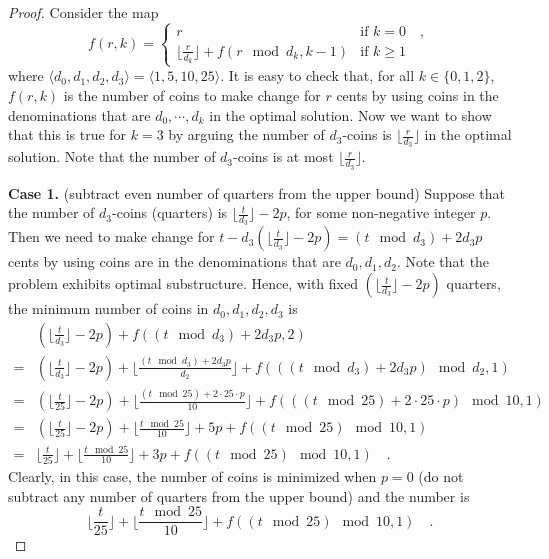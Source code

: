 \begin{proof}
    Consider the map 
    \begin{equation*}
        f(r, k) = 
    \begin{cases}
        r & \text{if } k = 0 \quad , \\
        \lfloor \frac{r}{d_k} \rfloor + f(r \mod d_k, k - 1)
            & \text{if } k \geq 1 
    \end{cases}
    \end{equation*}
    where $\langle d_0, d_1, d_2, d_3 \rangle = \langle 1, 5, 10, 25 \rangle$.
    It is easy to check that, for all $k \in \{ 0, 1, 2 \}$, 
    $f(r, k)$ is the number of coins to make change for $r$ cents 
    by using coins in the denominations that are $d_0, \cdots, d_k$
    in the optimal solution.
    Now we want to show that this is true for $k = 3$ 
    by arguing the number of $d_3$-coins is $\lfloor \frac{r}{d_3} \rfloor$ in the optimal solution.
    Note that the number of $d_3$-coins is 
    at most $\lfloor \frac{r}{d_3} \rfloor$.

    \textbf{Case 1. } (subtract even number of quarters from the upper bound) 
    Suppose that the number of $d_3$-coins (quarters) is 
    $\lfloor \frac{t}{d_3} \rfloor - 2p$, for some non-negative integer $p$.
    Then we need to make change for 
    $t - d_3 (\lfloor \frac{t}{d_3} \rfloor - 2p) = (t \mod d_3) + 2 d_3 p$ cents
    by using coins are in the denominations that are $d_0, d_1, d_2$.
    Note that the problem exhibits optimal substructure.
    Hence, with fixed $(\lfloor \frac{t}{d_3} \rfloor - 2p)$ quarters, 
    the minimum number of coins in $d_0, d_1, d_2, d_3$ is 
    \begin{equation*}
    \begin{split}
        & (\lfloor \frac{t}{d_3} \rfloor - 2p) + f((t \mod d_3) + 2 d_3 p, 2) \\
        = & (\lfloor \frac{t}{d_3} \rfloor - 2p) 
        + \lfloor \frac{(t \mod d_3) + 2 d_3 p}{d_2} \rfloor 
        + f(((t \mod d_3) + 2 d_3 p) \mod d_2, 1) \\
        = & (\lfloor \frac{t}{25} \rfloor - 2p) 
        + \lfloor \frac{(t \mod 25) + 2 \cdot 25 \cdot p}{10} \rfloor 
        + f(((t \mod 25) + 2 \cdot 25 \cdot p) \mod 10, 1) \\
        = & (\lfloor \frac{t}{25} \rfloor - 2p) 
        + \lfloor \frac{t \mod 25}{10} \rfloor + 5 p 
        + f((t \mod 25) \mod 10, 1) \\
        = & \lfloor \frac{t}{25} \rfloor
        + \lfloor \frac{t \mod 25}{10} \rfloor + 3 p 
        + f((t \mod 25) \mod 10, 1) 
        \quad .
    \end{split}
    \end{equation*}
    Clearly, in this case, the number of coins is minimized when $p = 0$ 
    (do not subtract any number of quarters from the upper bound) and the number is 
    \begin{equation*}
        \lfloor \frac{t}{25} \rfloor
        + \lfloor \frac{t \mod 25}{10} \rfloor 
        + f((t \mod 25) \mod 10, 1) 
        \quad .
    \end{equation*}


\end{proof}

